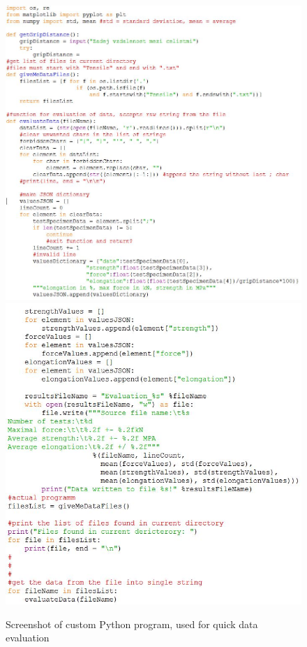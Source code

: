 \documentclass[a4paper, 11pt, reqno]{report}
\begin{document}
\begin{figure}[h]
\includegraphics[scale=0.7]{python1}
\includegraphics[scale=0.7]{python2}
\caption{Screenshot of custom Python program, used for quick data evaluation}
\end{figure}
%
\clearpage
\end{document}
